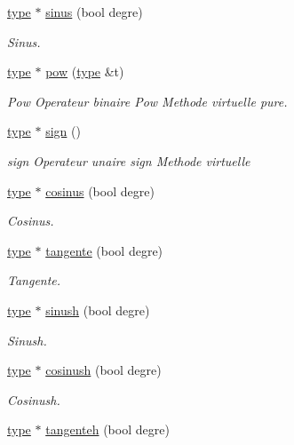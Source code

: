 \begin{DoxyCompactItemize}
\hyperlink{classtype}{type} $\ast$ \hyperlink{classreel_a3502ff761467546024da46f1f2bbb2e7}{sinus} (bool degre)
\begin{DoxyCompactList}\small\item\em Sinus. \end{DoxyCompactList}\item 
\hyperlink{classtype}{type} $\ast$ \hyperlink{classreel_a4fdea6a69bd78b2593fb44cc172fc7bf}{pow} (\hyperlink{classtype}{type} \&t)
\begin{DoxyCompactList}\small\item\em Pow Operateur binaire Pow Methode virtuelle pure. \end{DoxyCompactList}\item 
\hyperlink{classtype}{type} $\ast$ \hyperlink{classreel_a9a172c44e0a496059bdd1c4d53a98590}{sign} ()
\begin{DoxyCompactList}\small\item\em sign Operateur unaire sign Methode virtuelle \end{DoxyCompactList}\item 
\hyperlink{classtype}{type} $\ast$ \hyperlink{classreel_ab1d6bb643ca3335b8cb19e1b7eb89878}{cosinus} (bool degre)
\begin{DoxyCompactList}\small\item\em Cosinus. \end{DoxyCompactList}\item 
\hyperlink{classtype}{type} $\ast$ \hyperlink{classreel_a88d653b80c7d3a1a4f9c4ac4b709957b}{tangente} (bool degre)
\begin{DoxyCompactList}\small\item\em Tangente. \end{DoxyCompactList}\item 
\hyperlink{classtype}{type} $\ast$ \hyperlink{classreel_a410b5cc4316eeddbeff2ec46c13ca249}{sinush} (bool degre)
\begin{DoxyCompactList}\small\item\em Sinush. \end{DoxyCompactList}\item 
\hyperlink{classtype}{type} $\ast$ \hyperlink{classreel_a94a01afa4662790da504857247837160}{cosinush} (bool degre)
\begin{DoxyCompactList}\small\item\em Cosinush. \end{DoxyCompactList}\item 
\hyperlink{classtype}{type} $\ast$ \hyperlink{classreel_a00cb6cca23061d928135c074a5d69eb0}{tangenteh} (bool degre)

\end{DoxyCompactItemize}
